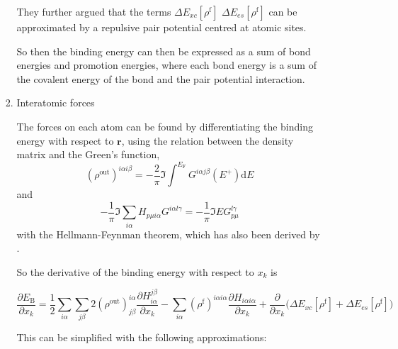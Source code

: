 \documentclass[11pt]{article}
\begin{document}
\begin{enumerate}
\begin{enumerate}
\begin{enumerate}
They further argued that the terms \(\Delta E_{xc}[\rho^{\text{f}}]\) 
\(\Delta E_{es}[\rho^{\text{f}}]\) can be approximated by a repulsive pair potential
centred at atomic sites.

So then the binding energy can then be expressed as a sum of bond energies and
promotion energies, where each bond energy is a sum of the covalent energy of
the bond and the pair potential interaction. 

\item Interatomic forces
\label{sec:orgf84ff16}

The forces on each atom can be found by differentiating the binding energy
with respect to \(\mathbf{r}\), using the relation between the density matrix
and the Green's function,
\[
(\rho^{\text{out}})^{i\alpha i\beta} = -\frac{2}{\pi} \Im \int^{E_{\text{F}}} 
   G^{i\alpha j\beta} (E^{+}) \text{d}E
\]
and 
\[
 -\frac{1}{\pi} \Im \sum_{i \alpha} H_{p\mu i\alpha} G^{i\alpha l\gamma}
     =  -\frac{1}{\pi} \Im E G_{p\mu}^{l\gamma}
\]
with the Hellmann-Feynman theorem, which has also been derived by
\cite{Foulkes1989}. 

So the derivative of the binding energy with respect to \(x_k\) is 

\begin{equation}
\frac{\partial E_{\text{B}}}{\partial x_{k}} = 
   \frac{1}{2}\sum_{i\alpha}\sum_{j\beta} 2(\rho^{\text{out}})^{i\alpha}_{j\beta}
       \frac{\partial H^{j\beta}_{i\alpha}}{\partial x_{k}}
 - \sum_{i\alpha} (\rho^{\text{f}})^{i\alpha i\alpha} 
                  \frac{\partial H_{i\alpha i\alpha}}{\partial x_{k}}
 + \frac{\partial}{\partial x_{k}} \big(\Delta E_{xc}[\rho^{\text{f}}] + \Delta E_{es}[\rho^{\text{f}}] \big )
\end{equation}


This can be simplified with the following approximations:


\end{enumerate}
\end{enumerate}
\end{enumerate}
\end{document}
